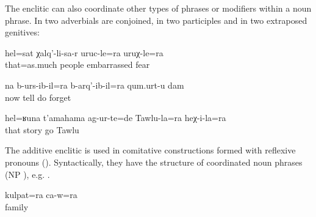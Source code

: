 The enclitic can also coordinate other types of phrases or modifiers within a noun phrase. In  two adverbials are conjoined, in  two participles and in  two extraposed genitives:
%
\begin{exe}
	\ex	\label{ex:‎‎‎as much as being embarrassed and anxious in front of people}
	\gll	hel=sat	χalq'-li-sa-r	uruc-le=ra		uruχ-le=ra\\
		that=as.much	people	embarrassed\tsc{-advz=add}	fear\\
	\glt	{}

	\ex	\label{ex:‎Now I forget what I say and what I do}
	\gll	na	b-urs-ib-il=ra	b-arq'-ib-il=ra	qum.urt-u	dam\\
		now	tell do	forget	\\
	\glt	{}

	\ex	\label{ex:‎Such a story happened to Tawlu and him}
	\gll	hel=ʁuna	t'amahama	ag-ur-te=de	Tawlu-la=ra	heχ-i-la=ra\\
		that	story	go	Tawlu	\\
	\glt	{}
\end{exe}

The additive enclitic is used in comitative constructions formed with reflexive pronouns (). Syntactically, they have the structure of coordinated noun phrases (NP ), e.g. .
%
\begin{exe}
	\ex	\label{ex:with his family}
	\gll	kulpat=ra ca-w=ra\\
		family	\\
	\glt	{}
\end{exe}

